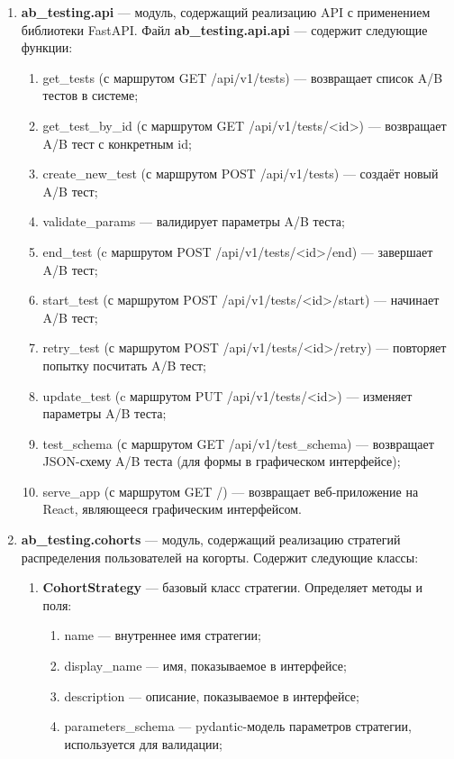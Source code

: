\documentclass[../document.tex]{subfiles}
\begin{document}
	\begin{enumerate}
		\item \textbf{ab\_testing.api} --- модуль, содержащий реализацию API с применением библиотеки FastAPI. Файл \textbf{ab\_testing.api.api} --- содержит следующие функции:
		\begin{enumerate}
			\item get\_tests (с маршрутом GET /api/v1/tests) --- возвращает список A/B тестов в системе;
			\item get\_test\_by\_id (с маршрутом GET /api/v1/tests/<id>) --- возвращает A/B тест с конкретным id;
			\item create\_new\_test (с маршрутом POST /api/v1/tests) --- создаёт новый A/B тест;
			\item validate\_params --- валидирует параметры A/B теста;
			\item end\_test (c маршрутом POST /api/v1/tests/<id>/end) --- завершает A/B тест;
			\item start\_test (с маршрутом POST /api/v1/tests/<id>/start) --- начинает A/B тест;
			\item retry\_test (с маршрутом POST /api/v1/tests/<id>/retry) --- повторяет попытку посчитать A/B тест;
			\item update\_test (c маршрутом PUT /api/v1/tests/<id>) --- изменяет параметры A/B теста;
			\item test\_schema (с маршрутом GET /api/v1/test\_schema) --- возвращает JSON-схему A/B теста (для формы в графическом интерфейсе);
			\item serve\_app (с маршрутом GET /) --- возвращает веб-приложение на React, являющееся графическим интерфейсом.
		\end{enumerate}
		\item \textbf{ab\_testing.cohorts} --- модуль, содержащий реализацию стратегий распределения пользователей на когорты. Содержит следующие классы:
		\begin{enumerate}
			\item \textbf{CohortStrategy} --- базовый класс стратегии. Определяет методы и поля:
			\begin{enumerate}
				\item name --- внутреннее имя стратегии;
				\item display\_name --- имя, показываемое в интерфейсе;
				\item description --- описание, показываемое в интерфейсе;
				\item parameters\_schema --- pydantic-модель параметров стратегии, используется для валидации;

\end{enumerate}
\end{enumerate}
\end{enumerate}
\end{document}
